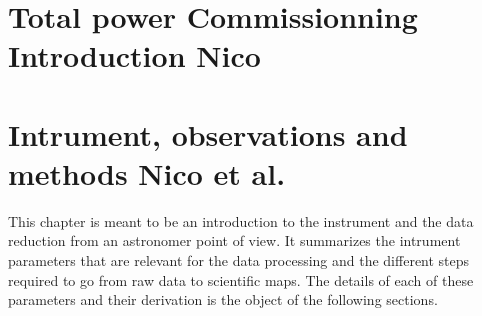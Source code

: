 \documentclass[a4paper, 11pt]{report}
\begin{document}
\newpage
%
%



\chapter{Total power Commissionning Introduction {\color{blue} Nico}}
\label{se:intro}


\clearpage
\chapter{Intrument, observations and methods {\color{blue} Nico et al.}}

This chapter is meant to be an introduction to the instrument and the data
reduction from an astronomer point of view. It summarizes the intrument
parameters that are relevant for the data processing and the different steps
required to go from raw data to scientific maps. The details of each of these
parameters and their derivation is the object of the following sections.








\end{document}

